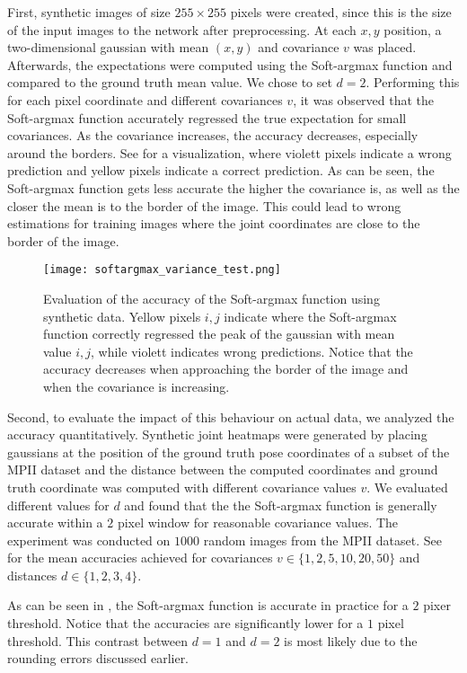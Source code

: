 First, synthetic images of size $255 \times 255$ pixels were created, since this is the size of the input images to the network after preprocessing.
At each $x,y$ position, a two-dimensional gaussian with mean $(x,y)$ and covariance $v$ was placed.
Afterwards, the expectations were computed using the Soft-argmax function and compared to the ground truth mean value.
We chose to set $d=2$.
Performing this for each pixel coordinate and different covariances $v$, it was observed that the Soft-argmax function accurately regressed the true expectation for small covariances.
As the covariance increases, the accuracy decreases, especially around the borders.
See  for a visualization, where violett pixels indicate a wrong prediction and yellow pixels indicate a correct prediction.
As can be seen, the Soft-argmax function gets less accurate the higher the covariance is, as well as the closer the mean is to the border of the image.
This could lead to wrong estimations for training images where the joint coordinates are close to the border of the image.

\begin{figure}[htb!]
    \centering
    \texttt{[image: softargmax\_variance\_test.png]}
    \caption{Evaluation of the accuracy of the Soft-argmax function using synthetic data. Yellow pixels $i,j$ indicate where the Soft-argmax function correctly regressed the peak of the gaussian with mean value $i,j$, while violett indicates wrong predictions. Notice that the accuracy decreases when approaching the border of the image and when the covariance is increasing. }
    \label{fig:softargmax_variance_test}
\end{figure}

Second, to evaluate the impact of this behaviour on actual data, we analyzed the accuracy quantitatively.
Synthetic joint heatmaps were generated by placing gaussians at the position of the ground truth pose coordinates of a subset of the MPII dataset and the distance between the computed coordinates and ground truth coordinate was computed with different covariance values $v$.
We evaluated different values for $d$ and found that the the Soft-argmax function is generally accurate within a $2$ pixel window for reasonable covariance values.
The experiment was conducted on $1000$ random images from the MPII dataset.
See  for the mean accuracies achieved for covariances $v \in \{1, 2, 5, 10, 20, 50 \}$ and distances $d \in \{1, 2, 3, 4\}$.

As can be seen in , the Soft-argmax function is accurate in practice for a $2$ pixer threshold.
Notice that the accuracies are significantly lower for a $1$ pixel threshold.
This contrast between $d=1$ and $d=2$ is most likely due to the rounding errors discussed earlier.

